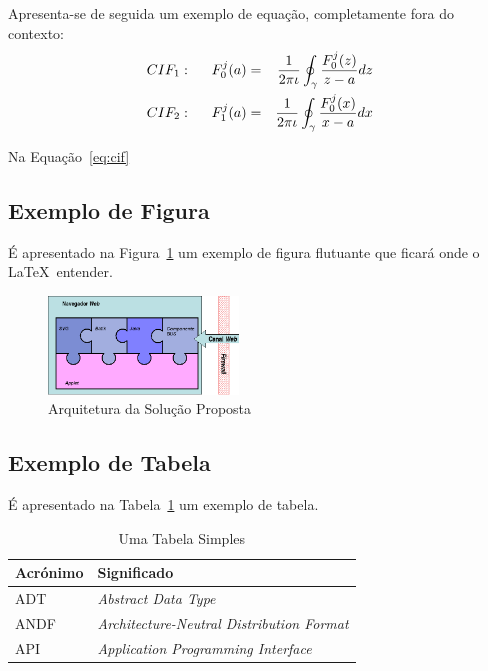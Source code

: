 \documentclass[twocolumn,twoside,11pt]{article}
\begin{document}
\lipsum[4]

Apresenta-se de seguida um exemplo de equação, completamente fora do contexto:
\begin{eqnarray}
CIF_1: \hspace*{5mm}F_0^j(a) &=& \frac{1}{2\pi \iota} \oint_{\gamma} \frac{F_0^j(z)}{z - a} dz\\
CIF_2: \hspace*{5mm}F_1^j(a) &=& \frac{1}{2\pi \iota} \oint_{\gamma} \frac{F_0^j(x)}{x - a} dx \label{eq:cif}
\end{eqnarray}

Na Equação~\ref{eq:cif} \lipsum[5]

\subsection{Exemplo de Figura}

É apresentado na Figura~\ref{fig:arch} %
um exemplo de figura flutuante que ficará onde o \LaTeX\ entender.

\begin{figure}
  \begin{center}
    \leavevmode
    \includegraphics[width=0.45\textwidth]{puzzle}
    \caption{Arquitetura da Solução Proposta}
    \label{fig:arch}
  \end{center}
\end{figure}

\lipsum[6]

\subsection{Exemplo de Tabela}

É apresentado na Tabela~\ref{tab:exemplo1} um exemplo de tabela.

\begin{table}[H]
  \centering
  \caption{Uma Tabela Simples}
  \begin{tabular}{| l | p{45mm} |}
    \hline
    \textbf{Acrónimo} & \textbf{Significado}\\
    \hline
    \hline
    ADT   & \emph{Abstract Data Type}\\\hline
    ANDF  & \emph{Architecture-Neutral Distribution Format}\\\hline
    API   & \emph{Application Programming Interface}\\
    \hline
  \end{tabular}
  \label{tab:exemplo1}
\end{table}
\end{document}
